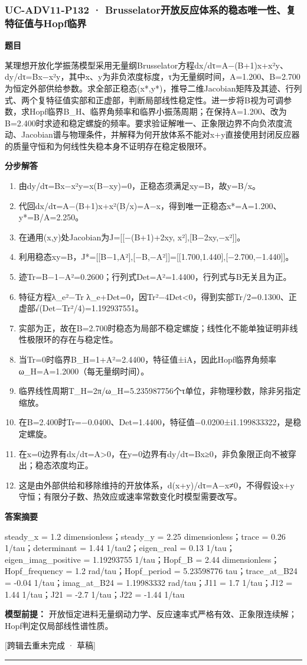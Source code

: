 \documentclass[UTF8,11pt,a4paper]{ctexart}
\begin{document}
\subsubsection*{UC-ADV11-P132 · Brusselator开放反应体系的稳态唯一性、复特征值与Hopf临界}
\noindent\textbf{题目}\par
某理想开放化学振荡模型采用无量纲Brusselator方程dx/dτ=A−(B+1)x+x²y、dy/dτ=Bx−x²y，其中x、y为非负浓度标度，τ为无量纲时间，A=1.200、B=2.700为恒定外部供给参数。求全部正稳态(x*,y*)，推导二维Jacobian矩阵及其迹、行列式、两个复特征值实部和正虚部，判断局部线性稳定性。进一步将B视为可调参数，求Hopf临界B\_H、临界角频率和临界小振荡周期；在保持A=1.200、改为B=2.400时求迹和稳定螺旋的频率。要求验证解唯一、正象限边界不向负浓度流动、Jacobian谱与物理条件，并解释为何开放体系不能对x+y直接使用封闭反应器的质量守恒和为何线性失稳本身不证明存在稳定极限环。\par
\medskip\noindent\textbf{分步解答}
\begin{enumerate}
\item 由dy/dτ=Bx−x²y=x(B−xy)=0，正稳态须满足xy=B，故y=B/x。
\item 代回dx/dτ=A−(B+1)x+x²(B/x)=A−x，得到唯一正稳态x*=A=1.200、y*=B/A=2.250。
\item 在通用(x,y)处Jacobian为J=[[−(B+1)+2xy, x²],[B−2xy,−x²]]。
\item 利用稳态xy=B，J*=[[B−1,A²],[−B,−A²]]=[[1.700,1.440],[−2.700,−1.440]]。
\item 迹Tr=B−1−A²=0.2600；行列式Det=A²=1.4400，行列式与B无关且为正。
\item 特征方程λ\_e²−Tr λ\_e+Det=0，因Tr²−4Det<0，得到实部Tr/2=0.1300、正虚部√(Det−Tr²/4)=1.192937551。
\item 实部为正，故在B=2.700时稳态为局部不稳定螺旋；线性化不能单独证明非线性极限环的存在与稳定性。
\item 当Tr=0时临界B\_H=1+A²=2.4400，特征值±iA，因此Hopf临界角频率ω\_H=A=1.2000（每无量纲时间）。
\item 临界线性周期T\_H=2π/ω\_H=5.235987756个τ单位，非物理秒数，除非另指定缩放。
\item 在B=2.400时Tr=−0.0400、Det=1.4400，特征值−0.0200±i1.199833322，是稳定螺旋。
\item 在x=0边界有dx/dτ=A>0，在y=0边界有dy/dτ=Bx≥0，非负象限正向不被穿出；稳态浓度均正。
\item 这是由外部供给和移除维持的开放体系，d(x+y)/dτ=A−x≠0，不得假设x+y守恒；有限分子数、热效应或速率常数变化时模型需要改写。
\end{enumerate}
\noindent\textbf{答案摘要}\par
steady\_x = 1.2 dimensionless；steady\_y = 2.25 dimensionless；trace = 0.26 1/tau；determinant = 1.44 1/tau2；eigen\_real = 0.13 1/tau；eigen\_imag\_positive = 1.19293755 1/tau；Hopf\_B = 2.44 dimensionless；Hopf\_frequency = 1.2 rad/tau；Hopf\_period = 5.23598776 tau；trace\_at\_B24 = -0.04 1/tau；imag\_at\_B24 = 1.19983332 rad/tau；J11 = 1.7 1/tau；J12 = 1.44 1/tau；J21 = -2.7 1/tau；J22 = -1.44 1/tau\par
\noindent\textbf{模型前提：}
开放恒定进料无量纲动力学、反应速率式严格有效、正象限连续解；Hopf判定仅局部线性谱性质。\par
\noindent\textcolor{red!65!black}{[跨辑去重未完成 · 草稿]} \par
\medskip\hrule\medskip
{}
\end{document}
